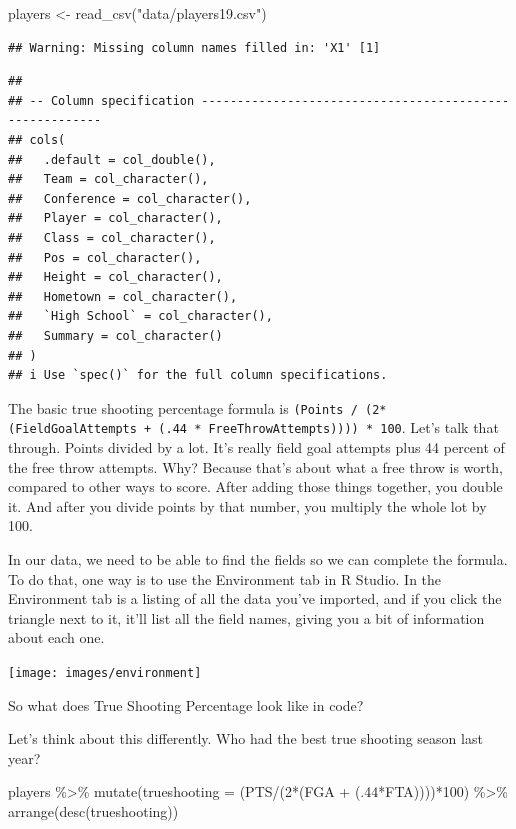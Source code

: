 \documentclass[
]{book}
\newenvironment{Shaded}{\begin{snugshade}}{\end{snugshade}}
\newcommand{\AttributeTok}[1]{\textcolor[rgb]{0.77,0.63,0.00}{#1}}
\newcommand{\DecValTok}[1]{\textcolor[rgb]{0.00,0.00,0.81}{#1}}
\newcommand{\FunctionTok}[1]{\textcolor[rgb]{0.00,0.00,0.00}{#1}}
\newcommand{\NormalTok}[1]{#1}
\newcommand{\OtherTok}[1]{\textcolor[rgb]{0.56,0.35,0.01}{#1}}
\newcommand{\SpecialCharTok}[1]{\textcolor[rgb]{0.00,0.00,0.00}{#1}}
\newcommand{\StringTok}[1]{\textcolor[rgb]{0.31,0.60,0.02}{#1}}
\begin{document}
\begin{Shaded}
\begin{Highlighting}[]
\NormalTok{players }\OtherTok{\textless{}{-}} \FunctionTok{read\_csv}\NormalTok{(}\StringTok{"data/players19.csv"}\NormalTok{)}
\end{Highlighting}
\end{Shaded}

\begin{verbatim}
## Warning: Missing column names filled in: 'X1' [1]
\end{verbatim}

\begin{verbatim}
## 
## -- Column specification --------------------------------------------------------
## cols(
##   .default = col_double(),
##   Team = col_character(),
##   Conference = col_character(),
##   Player = col_character(),
##   Class = col_character(),
##   Pos = col_character(),
##   Height = col_character(),
##   Hometown = col_character(),
##   `High School` = col_character(),
##   Summary = col_character()
## )
## i Use `spec()` for the full column specifications.
\end{verbatim}

The basic true shooting percentage formula is \texttt{(Points\ /\ (2*(FieldGoalAttempts\ +\ (.44\ *\ FreeThrowAttempts))))\ *\ 100}. Let's talk that through. Points divided by a lot. It's really field goal attempts plus 44 percent of the free throw attempts. Why? Because that's about what a free throw is worth, compared to other ways to score. After adding those things together, you double it. And after you divide points by that number, you multiply the whole lot by 100.

In our data, we need to be able to find the fields so we can complete the formula. To do that, one way is to use the Environment tab in R Studio. In the Environment tab is a listing of all the data you've imported, and if you click the triangle next to it, it'll list all the field names, giving you a bit of information about each one.

\texttt{[image: images/environment]}

So what does True Shooting Percentage look like in code?

Let's think about this differently. Who had the best true shooting season last year?

\begin{Shaded}
\begin{Highlighting}[]
\NormalTok{players }\SpecialCharTok{\%\textgreater{}\%}
  \FunctionTok{mutate}\NormalTok{(}\AttributeTok{trueshooting =}\NormalTok{ (PTS}\SpecialCharTok{/}\NormalTok{(}\DecValTok{2}\SpecialCharTok{*}\NormalTok{(FGA }\SpecialCharTok{+}\NormalTok{ (.}\DecValTok{44}\SpecialCharTok{*}\NormalTok{FTA))))}\SpecialCharTok{*}\DecValTok{100}\NormalTok{) }\SpecialCharTok{\%\textgreater{}\%}
  \FunctionTok{arrange}\NormalTok{(}\FunctionTok{desc}\NormalTok{(trueshooting))}
\end{Highlighting}
\end{Shaded}
\end{document}
